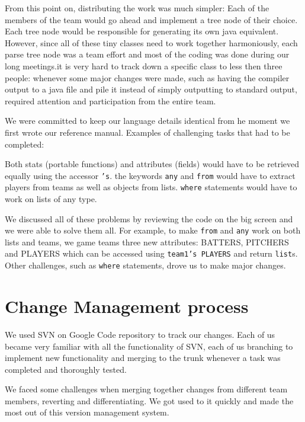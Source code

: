 From this point on, distributing the work was much simpler: Each of
the members of the team would go ahead and implement a tree node of
their choice. Each tree node would be responsible for generating its
own java equivalent. However, since all of these tiny classes need to
work together harmoniously, each parse tree node was a team effort and
most of the coding was done during our long meetings.it is very hard
to track down a specific class to less then three people: whenever
some major changes were made, such as having the compiler output to a
java file and pile it instead of simply outputting to standard output,
required attention and participation from the entire team.

We were committed to keep our language details identical from he
moment we first wrote our reference manual. Examples of challenging
tasks that had to be completed:

Both stats (portable functions) and attributes (fields) would have to
be retrieved equally using the accessor \texttt{'s}.  the keywords
\texttt{any} and \texttt{from} would have to extract players from
teams as well as objects from lists.  \texttt{where} statements would
have to work on lists of any type.

We discussed all of these problems by reviewing the code on the big
screen and we were able to solve them all. For example, to make
\texttt{from} and \texttt{any} work on both lists and teams, we game
teams three new attributes: BATTERS, PITCHERS and PLAYERS which can be
accessed using \texttt{team1's PLAYERS} and return
\texttt{list}s. Other challenges, such as \texttt{where} statements,
drove us to make major changes.


\section{Change Management process}

We used SVN on Google Code repository to track our changes. Each of us
became very familiar with all the functionality of SVN, each of us
branching to implement new functionality and merging to the trunk
whenever a task was completed and thoroughly tested.

We faced some challenges when merging together changes from different
team members, reverting and differentiating. We got used to it quickly
and made the most out of this version management system.
